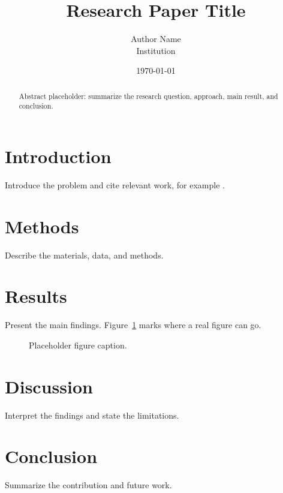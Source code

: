 \documentclass[11pt,a4paper]{article}
\title{Research Paper Title}
\author{Author Name\\Institution}
\date{\today}
\begin{document}
\maketitle

\begin{abstract}
Abstract placeholder: summarize the research question, approach, main result, and conclusion.
\end{abstract}

\section{Introduction}
Introduce the problem and cite relevant work, for example \cite{knuth1984literate}.

\section{Methods}
Describe the materials, data, and methods.

\section{Results}
Present the main findings. Figure~\ref{fig:placeholder} marks where a real figure can go.

\begin{figure}[htbp]
  \centering
  \caption{Placeholder figure caption.}
  \label{fig:placeholder}
\end{figure}

\section{Discussion}
Interpret the findings and state the limitations.

\section{Conclusion}
Summarize the contribution and future work.



\end{document}
